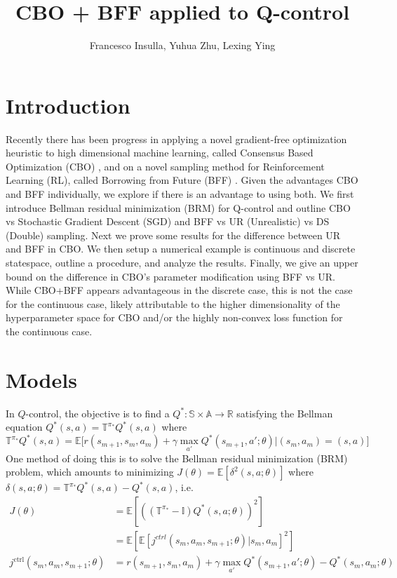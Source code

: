 \documentclass[10.5pt]{article}
\title{CBO + BFF applied to Q-control}
\author{Francesco Insulla, Yuhua Zhu, Lexing Ying}
\newcommand\bb{\mathbb}
\begin{document}
\maketitle

\section{Introduction}

Recently there has been progress in applying a novel gradient-free optimization heuristic to high dimensional machine learning, called Consensus Based Optimization (CBO) \cite{carrillo2020consensusbased}, and on a novel sampling method for Reinforcement Learning (RL), called Borrowing from Future (BFF) \cite{zhu2020borrowing}. Given the advantages CBO and BFF individually, we explore if there is an advantage to using both. We first introduce Bellman residual minimization (BRM) for Q-control and outline CBO vs Stochastic Gradient Descent (SGD) and BFF vs UR (Unrealistic) vs DS (Double) sampling. Next we prove some results for the difference between UR and BFF in CBO. We then setup a numerical example is continuous and discrete statespace, outline a procedure, and analyze the results. Finally, we give an upper bound on the difference in CBO's parameter modification using BFF vs UR. While CBO+BFF appears advantageous in the discrete case, this is not the case for the continuous case, likely attributable to the higher dimensionality of the hyperparameter space for CBO and/or the highly non-convex loss function for the continuous case.

\section{Models}

In $Q$-control, the objective is to find a $Q^*:\bb S\times \bb A\to \bb R$ satisfying the Bellman equation $Q^*(s,a)=\bb T^{\pi_*} Q^*(s,a)$ where
$$
\bb T^{\pi_*} Q^*(s,a) = \bb E\Big[r(s_{m+1},s_m, a_m)+\gamma \max_{a'}Q^*(s_{m+1},a';\theta)\Big|(s_m, a_m)=(s,a)\Big]
$$
One method of doing this is to solve the Bellman residual minimization (BRM) problem, which amounts to minimizing $J(\theta)=\bb E[\delta^2(s,a;\theta)]$ where $\delta(s,a;\theta) = \bb T^{\pi_*}Q^*(s,a) -Q^*(s,a)$, i.e.
\begin{align*}
    J(\theta) &= \mathbb E[((\mathbb T^{\pi_*}-\mathbb I) Q^*(s,a;\theta))^2]\\
&= \mathbb E[\mathbb E[j^{ctrl}(s_m, a_m, s_{m+1};\theta)|s_m,a_m]^2]\\
j^{\text{ctrl}}(s_m, a_m, s_{m+1};\theta) &= r(s_{m+1}, s_m, a_m)  + \gamma \max_{a'} Q^*(s_{m+1},a';\theta) - Q^*(s_m,a_m;\theta)
\end{align*}
\end{document}
